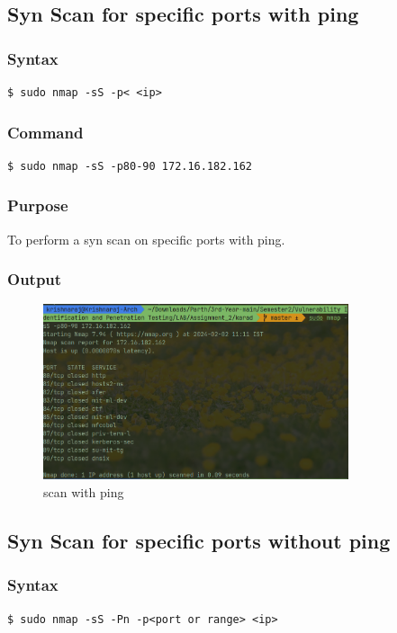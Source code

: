 \documentclass[11pt]{article}
\begin{document}
\subsection{Syn Scan for specific ports with ping}
\subsubsection{Syntax}
\begin{verbatim}
$ sudo nmap -sS -p< <ip>
\end{verbatim}

\subsubsection*{Command}
\begin{verbatim}
$ sudo nmap -sS -p80-90 172.16.182.162
\end{verbatim}

\subsubsection*{Purpose}
To perform a syn scan on specific ports with ping.

\subsubsection*{Output}
\begin{figure}[H]
    \centering
    \includegraphics[width=0.8\textwidth]{with ping scan.png}
    \caption{scan with ping}
    \label{fig:1}
\end{figure}


\subsection{Syn Scan for specific ports without ping}
\subsubsection{Syntax}
\begin{verbatim}
$ sudo nmap -sS -Pn -p<port or range> <ip>
\end{verbatim}
\end{document}
